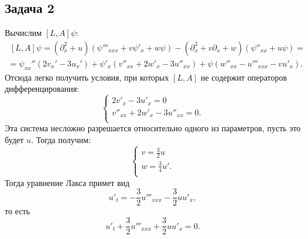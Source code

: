 \documentclass[12pt,a4paper]{article}
\newcommand{\p}{\partial}
\begin{document}
\subsection{Задача 2}
\noindent Вычислим $[L,A]\psi$:
\begin{equation}
\begin{gathered}
~[L,A]\psi = (\p_x^2+u)(\psi'''_{xxx}+v\psi'_x+w\psi) - (\p_x^3+v\p_x+w)(\psi''_{xx}+u\psi) = \\
=\psi_{xx}''(2v_x'-3u_x')+\psi'_x(v''_{xx}+2w'_x-3u''_{xx})+\psi(w''_{xx}-u'''_{xxx}-vu'_x).
\end{gathered}
\end{equation}
Отсюда легко получить условия, при которых $[L,A]$ не содержит операторов дифференцирования:
\begin{equation}
\begin{cases}
2v'_x-3u'_x=0\\
v''_{xx}+2w'_x-3u''_{xx}=0.\\
\end{cases}
\end{equation}
Эта система несложно разрешается относительно одного из параметров, пусть это будет $u$. Тогда получим:
\begin{equation}
\begin{cases}
v = \frac{3}{2}u\\
w = \frac{3}{4}u'.\\
\end{cases}
\end{equation}
Тогда уравнение Лакса примет вид
\begin{equation}
u'_t=-\frac{3}{2}u'''_{xxx}-\frac{3}{2}uu'_x,
\end{equation}
то есть
\begin{equation}
u'_t+\frac{3}{2}u'''_{xxx}+\frac{3}{2}uu'_x=0.
\end{equation}
\end{document}
